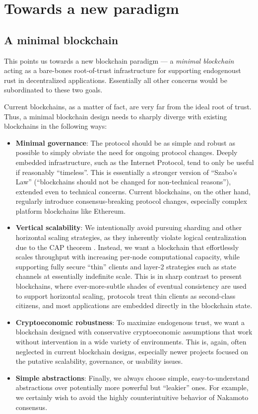 \documentclass[headinclude,12pt]{scrbook}
\begin{document}
\section{Towards a new paradigm}

\subsection{A minimal blockchain}

This points us towards a new blockchain paradigm --- a \emph{minimal blockchain} acting as a bare-bones root-of-trust infrastructure for supporting endogenoust rust in decentralized applications. Essentially all other concerns would be subordinated to these two goals.

Current blockchains, as a matter of fact, are very far from the ideal root of trust. Thus, a minimal blockchain design needs to sharply diverge with existing blockchains in the following ways:

\begin{itemize}
    \item \textbf{Minimal governance}: The protocol should be as simple and robust as possible to simply obviate the need for ongoing protocol changes. Deeply embedded infrastructure, such as the Internet Protocol, tend to only be useful if reasonably ``timeless''. This is essentially a stronger version of ``Szabo's Law'' (``blockchains should not be changed for non-technical reasons''), extended even to technical concerns. Current blockchains, on the other hand, regularly introduce consensus-breaking protocol changes, especially complex platform blockchains like Ethereum.
    \item \textbf{Vertical scalability}: We intentionally avoid pursuing sharding and other horizontal scaling strategies, as they inherently violate logical centralization due to the CAP theorem \cite{brewer2012cap}. Instead, we want a blockchain that effortlessly scales throughput with increasing per-node computational capacity, while supporting fully secure ``thin'' clients and layer-2 strategies such as state channels at essentially indefinite scale. This is in sharp contrast to present blockchains, where ever-more-subtle shades of eventual consistency are used to support horizontal scaling, protocols treat thin clients as second-class citizens, and most applications are embedded directly in the blockchain state.
    \item \textbf{Cryptoeconomic robustness}: To maximize endogenous trust, we want a blockchain designed with conservative cryptoeconomic assumptions that work without intervention in a wide variety of environments. This is, again, often neglected in current blockchain designs, especially newer projects focused on the putative scalability, governance, or usability issues.
    \item \textbf{Simple abstractions}: Finally, we always choose simple, easy-to-understand abstractions over potentially more powerful but ``leakier'' ones. For example, we certainly wish to avoid the highly counterintuitive behavior of Nakamoto consensus.
\end{itemize}
\end{document}
